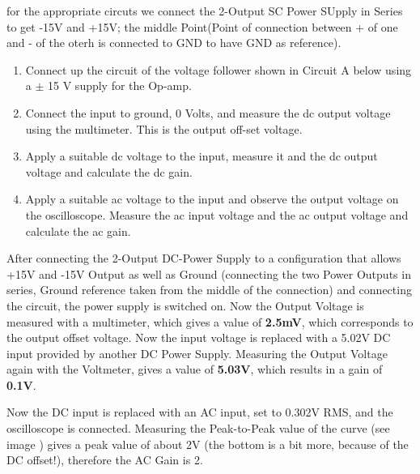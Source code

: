 



for the appropriate circuts we connect the 2-Output SC Power SUpply in Series to get -15V and +15V; the middle Point(Point of connection between + of one and - of the oterh is connected to GND to have GND as reference).





\begin{enumerate}
	
\item Connect up the circuit of the voltage follower shown in Circuit A below using a $\pm$ 15 V
supply for the Op-amp.
\item  Connect the input to ground, 0 Volts, and measure the dc output voltage using the multimeter. This is the output off-set voltage.
\item  Apply a suitable dc voltage to the input, measure it and the dc output voltage and calculate
the dc gain.
\item  Apply a suitable ac voltage to the input and observe the output voltage on the oscilloscope.
Measure the ac input voltage and the ac output voltage and calculate the ac gain.
\end{enumerate}



After connecting the 2-Output DC-Power Supply to a configuration that allows +15V and -15V Output as well as Ground (connecting the two Power Outputs in series, Ground reference taken from the middle of the connection) and connecting the circuit, the power supply is switched on.
Now the Output Voltage is measured with a multimeter, which gives a value of \textbf{2.5mV}, which corresponds to the output offset voltage.
\newline
Now the input voltage is replaced with a 5.02V DC input provided by another DC Power Supply.
\newline
Measuring the Output Voltage again with the Voltmeter, gives a value of \textbf{5.03V}, which results in a gain of \textbf{0.1V}.


Now the DC input is replaced with an AC input, set to 0.302V RMS, and the oscilloscope is connected. Measuring the Peak-to-Peak value of the curve (see image  ) gives a peak value of about 2V (the bottom is a bit more, because of the DC offset!), therefore the AC Gain is 2.





